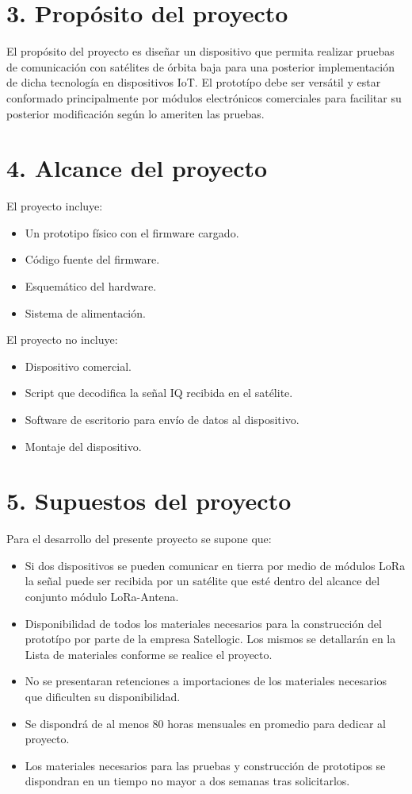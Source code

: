 \documentclass[
11pt, %
codirector, %
]{charter}
\begin{document}
\section{3. Propósito del proyecto}
\label{sec:proposito}

El propósito del proyecto es diseñar un dispositivo que permita realizar pruebas de comunicación con satélites de órbita baja para una posterior implementación de dicha tecnología en dispositivos IoT. El prototípo debe ser versátil y estar conformado principalmente por módulos electrónicos comerciales para facilitar su posterior modificación según lo ameriten las pruebas.


\section{4. Alcance del proyecto}
\label{sec:alcance}

El proyecto incluye:
\begin{itemize}
	\item Un prototipo físico con el firmware cargado.
	\item Código fuente del firmware.
	\item Esquemático del hardware.
	\item Sistema de alimentación.
\end{itemize}
El proyecto no incluye:
\begin{itemize}
	\item Dispositivo comercial.
	\item Script que decodifica la señal IQ recibida en el satélite.
	\item Software de escritorio para envío de datos al dispositivo.
	\item Montaje del dispositivo.
\end{itemize}


\section{5. Supuestos del proyecto}
\label{sec:supuestos}

Para el desarrollo del presente proyecto se supone que:

\begin{itemize}
	\item Si dos dispositivos se pueden comunicar en tierra por medio de módulos LoRa la señal puede ser recibida por un satélite que esté dentro del alcance del conjunto módulo LoRa-Antena.
	\item Disponibilidad de todos los materiales necesarios para la construcción del prototípo por parte de la empresa Satellogic. Los mismos se detallarán en la Lista de materiales conforme se realice el proyecto.
	\item No se presentaran retenciones a importaciones de los materiales necesarios que dificulten su disponibilidad.
	\item Se dispondrá de al menos 80 horas mensuales en promedio para dedicar al proyecto.
	\item Los materiales necesarios para las pruebas y construcción de prototipos se dispondran en un tiempo no mayor a dos semanas tras solicitarlos.
\end{itemize}
\end{document}
